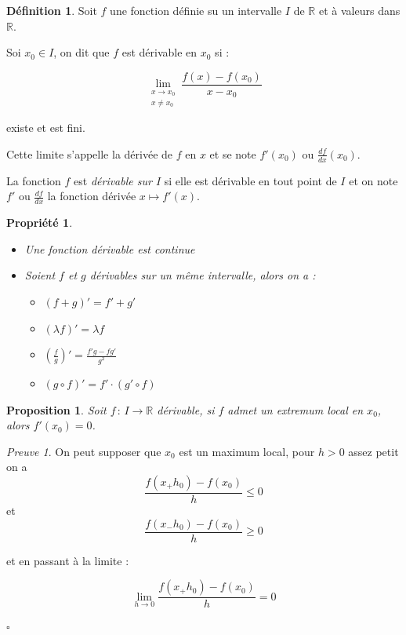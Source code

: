 \documentclass[]{article}
\newtheorem{myproposition}{Proposition}
\newtheorem{myproperty}{Propriété}
\theoremstyle{remark}
\newtheorem{myproof}{Preuve}
\theoremstyle{definition}
\newtheorem{mydef}{Définition}
\newcommand{\cqfd}{
	\hfill$\square$
}
\newcommand{\funcshort}[3]{
#1 \, : \, #2 \longrightarrow #3
}
\begin{document}
\begin{mydef}
	Soit $f$ une fonction définie su un intervalle $I$ de $\mathbb{R}$ et à valeurs dans $\mathbb{R}$.
	
	Soi $x_0 \in I$, on dit que $f$ est dérivable en $x_0$ si :
	
	$$\lim\limits_{\substack{x \to x_0 \\ x \neq x_0}} \frac{f(x) - f(x_0)}{x - x_0}$$
	
	existe et est fini.
	
	Cette limite s'appelle la dérivée de $f$ en $x$ et se note $f'(x_0)$ ou $\frac{df}{dx}(x_0)$.
	
	La fonction $f$ est \textit{dérivable sur $I$} si elle est dérivable en tout point de $I$ et on note $f'$ ou $\frac{df}{dx}$ la fonction dérivée $x \longmapsto f'(x)$.
\end{mydef}

\begin{myproperty}
	\leavevmode
	\begin{itemize}
		\item Une fonction dérivable est continue
		\item Soient $f$ et $g$ dérivables sur un même intervalle, alors on a :
		\begin{itemize}
			\item $(f+g)'=f'+g'$
			\item $(\lambda f)'=\lambda f$
			\item $(\frac{f}{g})'=\frac{f'g-fg'}{g^2}$
			\item $(g \circ f)'=f' \cdot (g' \circ f)$
		\end{itemize}
	\end{itemize}
\end{myproperty}

\begin{myproposition}
	Soit $\funcshort{f}{I}{\mathbb{R}}$ dérivable, si $f$ admet un extremum local en $x_0$, alors $f'(x_0) = 0$.
\end{myproposition}

\begin{myproof}
	On peut supposer que $x_0$ est un maximum local, pour $h > 0$ assez petit on a $$\frac{f(x_+h_0) - f(x_0)}{h} \leqslant 0$$
	et
	$$\frac{f(x_-h_0) - f(x_0)}{h} \geqslant 0$$
	
	et en passant à la limite :
	
	$$\lim\limits_{h \to 0} \frac{f(x_+h_0) - f(x_0)}{h} = 0$$
	
	\cqfd
\end{myproof}
\end{document}
